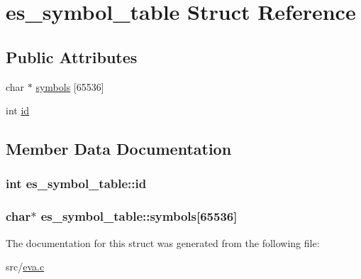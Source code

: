 \hypertarget{structes__symbol__table}{\section{es\-\_\-symbol\-\_\-table Struct Reference}
\label{structes__symbol__table}
}
\subsection*{Public Attributes}
\begin{DoxyCompactItemize}
\item 
char $\ast$ \hyperlink{structes__symbol__table_a9da5adae8e0a2c235dda4d08cb43ef70}{symbols} \mbox{[}65536\mbox{]}
\item 
int \hyperlink{structes__symbol__table_a848c28878232b9ce3798e146b9bfe26f}{id}
\end{DoxyCompactItemize}


\subsection{Member Data Documentation}
\hypertarget{structes__symbol__table_a848c28878232b9ce3798e146b9bfe26f}{
\subsubsection[{id}]{\setlength{\rightskip}{0pt plus 5cm}int es\-\_\-symbol\-\_\-table\-::id}}\label{structes__symbol__table_a848c28878232b9ce3798e146b9bfe26f}
\hypertarget{structes__symbol__table_a9da5adae8e0a2c235dda4d08cb43ef70}{
\subsubsection[{symbols}]{\setlength{\rightskip}{0pt plus 5cm}char$\ast$ es\-\_\-symbol\-\_\-table\-::symbols\mbox{[}65536\mbox{]}}}\label{structes__symbol__table_a9da5adae8e0a2c235dda4d08cb43ef70}


The documentation for this struct was generated from the following file\-:\begin{DoxyCompactItemize}
\item 
src/\hyperlink{eva_8c}{eva.\-c}\end{DoxyCompactItemize}
